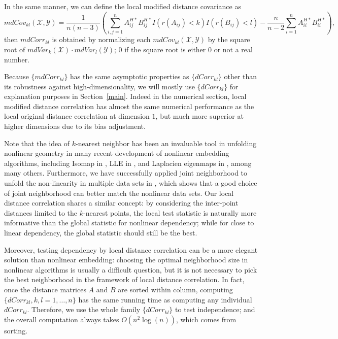 \documentclass[12pt]{article}
\begin{document}
In the same manner, we can define the local modified distance covariance as 
\begin{equation}
\label{localmdCovEqu}
mdCov_{kl}(\mathcal{X},\mathcal{Y})=\frac{1}{n(n-3)}(\sum_{i,j=1}^{n}A^{H*}_{ij}B^{H*}_{ij}I(r(A_{ij})<k)I(r(B_{ij})<l)-\frac{n}{n-2}\sum_{i=1}^{n}A^{H*}_{ii}B^{H*}_{ii}),
\end{equation}
then $mdCorr_{kl}$ is obtained by normalizing each $mdCov_{kl}(\mathcal{X},\mathcal{Y})$ by the square root of $mdVar_{k}(\mathcal{X}) \cdot mdVar_{l}(\mathcal{Y})$; $0$ if the square root is either $0$ or not a real number.

Because $\{mdCorr_{kl}\}$ has the same asymptotic properties as $\{dCorr_{kl}\}$ other than its robustness against high-dimensionality, we will mostly use $\{dCorr_{kl}\}$ for explanation purposes in Section~\ref{main}. Indeed in the numerical section, local modified distance correlation has almost the same numerical performance as the local original distance correlation at dimension $1$, but much more superior at higher dimensions due to its bias adjustment.

Note that the idea of $k$-nearest neighbor has been an invaluable tool in unfolding nonlinear geometry in many recent development of nonlinear embedding algorithms, including Isomap in \cite{TenenbaumSilvaLangford2000, SilvaTenenbaum2003}, LLE in \cite{SaulRoweis2000, RoweisSaul2003}, and Laplacien eigenmaps in \cite{BelkinNiyogi2003}, among many others. Furthermore, we have successfully applied joint neighborhood to unfold the non-linearity in multiple data sets in \cite{ShenVogelsteinPriebe2015}, which shows that a good choice of joint neighborhood can better match the nonlinear data sets. Our local distance correlation shares a similar concept: by considering the inter-point distances limited to the $k$-nearest points, the local test statistic is naturally more informative than the global statistic for nonlinear dependency; while for close to linear dependency, the global statistic should still be the best.

Moreover, testing dependency by local distance correlation can be a more elegant solution than nonlinear embedding: choosing the optimal neighborhood size in nonlinear algorithms is usually a difficult question, but it is not necessary to pick the best neighborhood in the framework of local distance correlation. In fact, once the distance matrices $A$ and $B$ are sorted within column, computing $\{dCorr_{kl}, k,l=1,\ldots,n\}$ has the same running time as computing any individual $dCorr_{kl}$. Therefore, we use the whole family $\{dCorr_{kl}\}$ to test independence; and the overall computation always takes $O(n^2 \log(n))$, which comes from sorting. 
\end{document}
